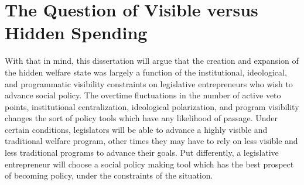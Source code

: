 \documentclass[12pt]{article}
\begin{document}
\section{The Question of Visible versus Hidden Spending}
With that in mind, this dissertation will argue that the creation and expansion of the hidden welfare state was largely a function of the institutional, ideological, and programmatic visibility constraints on legislative entrepreneurs who wish to advance social policy. The overtime fluctuations in the number of active veto points, institutional centralization, ideological polarization, and program visibility changes the sort of policy tools which have any likelihood of passage. Under certain conditions, legislators will be able to advance a highly visible and traditional welfare program, other times they may have to rely on less visible and less traditional programs to advance their goals. Put differently, a legislative entrepreneur will choose a social policy making tool which has the best prospect of becoming policy, under the constraints of the situation.
\end{document}
